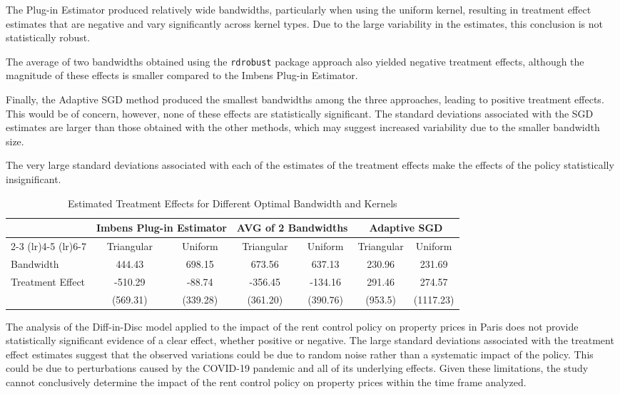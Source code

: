 \documentclass[12pt]{article}
\theoremstyle{plain}
\theoremstyle{remark}
\def\code#1{\texttt{#1}}
\begin{document}
The Plug-in Estimator produced relatively wide bandwidths, particularly when using the uniform kernel, resulting in treatment effect estimates that are negative and vary significantly across kernel types. Due to the large variability in the estimates, this conclusion is not statistically robust.

The average of two bandwidths obtained using the \code{rdrobust} package approach also yielded negative treatment effects, although the magnitude of these effects is smaller compared to the Imbens Plug-in Estimator.

Finally, the Adaptive SGD method produced the smallest bandwidths among the three approaches, leading to positive treatment effects. This would be of concern, however, none of these effects are statistically significant. The standard deviations associated with the SGD estimates are larger than those obtained with the other methods, which may suggest increased variability due to the smaller bandwidth size. 

The very large standard deviations associated with each of the estimates of the treatment effects make the effects of the policy statistically insignificant.   


\begin{table}[h]
    \centering
    \caption{Estimated Treatment Effects for Different Optimal Bandwidth and Kernels}
    \begin{tabular}{lcccccc}
        \toprule
        & \multicolumn{2}{c}{Imbens Plug-in Estimator} & \multicolumn{2}{c}{AVG of 2 Bandwidths} & \multicolumn{2}{c}{Adaptive SGD} \\
        \cmidrule(lr){2-3} \cmidrule(lr){4-5} \cmidrule(lr){6-7}
        \multirow{2}{*} & Triangular & Uniform & Triangular & Uniform & Triangular & Uniform \\
        \midrule
        Bandwidth & 444.43 & 698.15 & 673.56 & 637.13 & 230.96 & 231.69 \\ 
        Treatment Effect & -510.29 & -88.74 & -356.45 & -134.16 & 291.46 & 274.57 \\
        & \scriptsize{(569.31)} & \scriptsize{(339.28)} & \scriptsize{(361.20)} & \scriptsize{(390.76)} & \scriptsize{(953.5)} & \scriptsize{(1117.23)} \\
        \bottomrule
    \end{tabular}
    \label{tab:application_results}
\end{table}

The analysis of the Diff-in-Disc model applied to the impact of the rent control policy on property prices in Paris does not provide statistically significant evidence of a clear effect, whether positive or negative. The large standard deviations associated with the treatment effect estimates suggest that the observed variations could be due to random noise rather than a systematic impact of the policy. This could be due to perturbations caused by the COVID-19 pandemic and all of its underlying effects.
Given these limitations, the study cannot conclusively determine the impact of the rent control policy on property prices within the time frame analyzed.
\end{document}
